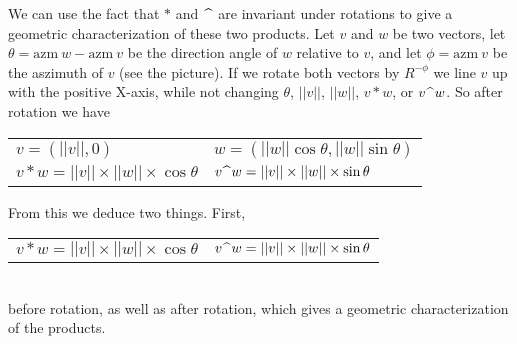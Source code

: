\documentclass[12pt]{article}
\begin{document}
\begin{minipage}{\textwidth}\raggedright
\begin{wrapfigure}{r}{0.5\textwidth}
\end{wrapfigure}
We can use the fact that $*$ and $\,\widehat{~}\,$ are invariant under
rotations to give a geometric characterization
of these two products.  Let $v$ and $w$ be two vectors, let
$\theta=\mathrm{azm}~w - \mathrm{azm}~v$ be the direction angle of $w$
relative to $v$, and let $\phi = \mathrm{azm}~v$ be the aszimuth of $v$
(see the picture).
If we rotate both vectors by $R^{-\phi}$
we line $v$ up with the positive X-axis, while not changing $\theta$,
$||v||$, $||w||$, $v*w$, or $v\,\widehat{~}\, w$.  So after rotation we have
\hspace*{0.5in}
    \begin{tabular}{l@{~~~~~}l}
    $v=(||v||,0)$ &
    $w=(||w||\cos\theta,||w||\sin\theta)$ \\
    $v*w=||v||\times||w||\times\cos\theta$ & 
    $v\,\widehat{~}\, w=||v||\times||w||\times\sin\theta$ \\
    \end{tabular}
\end{minipage}

From this we deduce two things.  First, \\
\hspace*{0.5in}
    \begin{tabular}{l@{~~~~~}l}
    $v*w=||v||\times||w||\times\cos\theta$ &
    $v\,\widehat{~}\, w=||v||\times||w||\times\sin\theta$ \\
    \end{tabular} \\
before rotation, as well as after rotation,
which gives a geometric characterization of the products.
\end{document}
